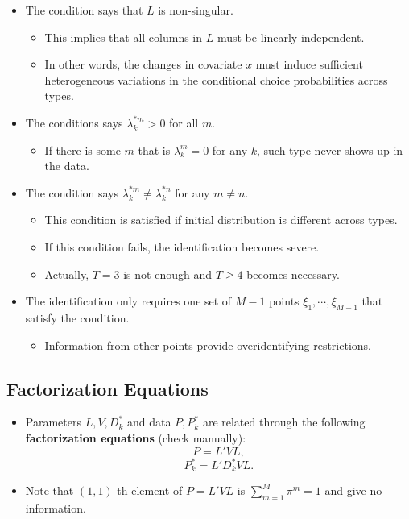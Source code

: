 \documentclass[]{book}
\providecommand{\tightlist}{%
  \setlength{\itemsep}{0pt}\setlength{\parskip}{0pt}}
\begin{document}
\begin{itemize}
\tightlist
\item
  The condition says that \(L\) is non-singular.

  \begin{itemize}
  \tightlist
  \item
    This implies that all columns in \(L\) must be linearly independent.
  \item
    In other words, the changes in covariate \(x\) must induce
    sufficient heterogeneous variations in the conditional choice
    probabilities across types.
  \end{itemize}
\item
  The conditions says \(\lambda_k^{*m} > 0\) for all \(m\).

  \begin{itemize}
  \tightlist
  \item
    If there is some \(m\) that is \(\lambda_k^m = 0\) for any \(k\),
    such type never shows up in the data.
  \end{itemize}
\item
  The condition says \(\lambda_k^{*m} \neq \lambda_k^{*n}\) for any
  \(m \neq n\).

  \begin{itemize}
  \tightlist
  \item
    This condition is satisfied if initial distribution is different
    across types.
  \item
    If this condition fails, the identification becomes severe.
  \item
    Actually, \(T = 3\) is not enough and \(T \ge 4\) becomes necessary.
  \end{itemize}
\item
  The identification only requires one set of \(M - 1\) points
  \(\xi_1, \cdots, \xi_{M - 1}\) that satisfy the condition.

  \begin{itemize}
  \tightlist
  \item
    Information from other points provide overidentifying restrictions.
  \end{itemize}
\end{itemize}

\subsection{Factorization Equations}\label{factorization-equations}

\begin{itemize}
\tightlist
\item
  Parameters \(L, V, D_k^*\) and data \(P, P_k^*\) are related through
  the following \textbf{factorization equations} (check manually): \[
  P = L' V L,
  \] \[
  P_k^* = L'D_k^*VL.
  \]
\item
  Note that \((1, 1)\)-th element of \(P = L'VL\) is
  \(\sum_{m = 1}^M \pi^m = 1\) and give no information.
\end{itemize}
\end{document}
